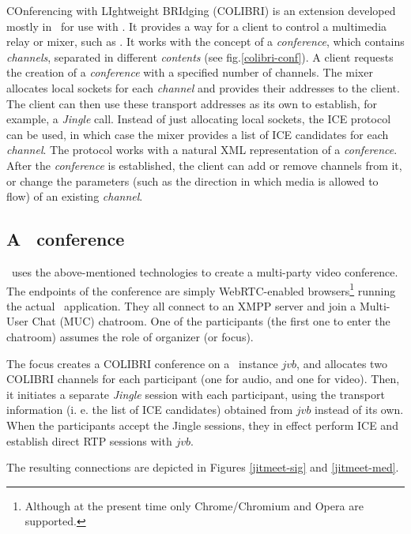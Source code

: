 \documentclass[twoside,openright,a4paper,11pt,english]{article}
\begin{document}
COnferencing with LIghtweight BRIdging (COLIBRI\cite{colibri}) is an extension
developed mostly in \bj\ for use with \jvb. It provides a way for a client to control a multimedia
relay or mixer, such as \jvb. It works with the concept of a \emph{conference}, which contains
\emph{channels}, separated in different \emph{contents} (see fig.\ref{colibri-conf}). A
client requests the creation of a \emph{conference} with a specified number of
channels. The mixer allocates local sockets for each \emph{channel} and
provides their addresses to the client. The client can then use these transport
addresses as its own to establish, for example, a \emph{Jingle} call. 
Instead of just allocating local sockets, the ICE protocol can be used, in
which case the mixer provides a list of ICE candidates for each \emph{channel}.
The protocol works with a natural XML representation of a \emph{conference}.
After the \emph{conference} is established, the client can add or remove channels
from it, or change the parameters (such as the direction in which
media is allowed to flow) of an existing \emph{channel}.





\subsection{A \jm\ conference}
\label{intro-jm}
\jm\ uses the above-mentioned technologies to create a multi-party video conference.
The endpoints of the conference are simply WebRTC-enabled
browsers\footnote{Although at the present time only Chrome/Chromium and Opera are
supported.} running the actual \jm\ application. They all connect to an XMPP
server and join a Multi-User Chat (MUC) chatroom. One of the participants (the
first one to enter the chatroom) assumes the role of organizer (or focus).

The focus creates a COLIBRI conference on a \jvb\ instance $jvb$, and allocates
two COLIBRI channels for each participant (one for audio, and one for video).
Then, it initiates a separate \emph{Jingle} session with
each participant, using the
transport information (i. e. the list of ICE candidates) obtained from $jvb$
instead of its own. When the participants accept the Jingle sessions, they in
effect perform ICE and establish direct RTP sessions with $jvb$.

The resulting connections are depicted in Figures \ref{jitmeet-sig} and \ref{jitmeet-med}.
\end{document}
